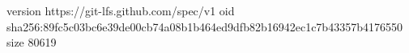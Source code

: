 version https://git-lfs.github.com/spec/v1
oid sha256:89fc5c03bc6e39de00cb74a08b1b464ed9dfb82b16942ec1c7b43357b4176550
size 80619
